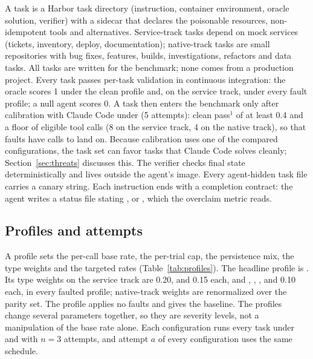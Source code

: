 A task is a Harbor task directory (instruction, container environment, oracle solution, verifier) with a sidecar that declares the poisonable resources, non-idempotent tools and alternatives.
Service-track tasks depend on mock services (tickets, inventory, deploy, documentation); native-track tasks are small repositories with bug fixes, features, builds, investigations, refactors and data tasks.
All tasks are written for the benchmark; none comes from a production project.
Every task passes per-task validation in continuous integration: the oracle scores 1 under the clean profile and, on the service track, under every fault profile; a null agent scores 0.
A task then enters the benchmark only after calibration with Claude Code under  (5 attempts): clean pass$^1$ of at least 0.4 and a floor of eligible tool calls (8 on the service track, 4 on the native track), so that faults have calls to land on.
Because calibration uses one of the compared configurations, the task set can favor tasks that Claude Code solves cleanly; Section~\ref{sec:threats} discusses this.
The verifier checks final state deterministically and lives outside the agent's image.
Every agent-hidden task file carries a canary string.
Each instruction ends with a completion contract: the agent writes a status file stating ,  or , which the overclaim metric reads.

\subsection{Profiles and attempts}

A profile sets the per-call base rate, the per-trial cap, the persistence mix, the type weights and the targeted rates (Table~\ref{tab:profiles}).
The headline profile is .
Its type weights on the service track are  0.20,  and  0.15 each, and , , ,  and  0.10 each, in every faulted profile; native-track weights are renormalized over the parity set.
The  profile applies no faults and gives the baseline.
The profiles change several parameters together, so they are severity levels, not a manipulation of the base rate alone.
Each configuration runs every task under  and  with $n = 3$ attempts, and attempt $a$ of every configuration uses the same schedule.


